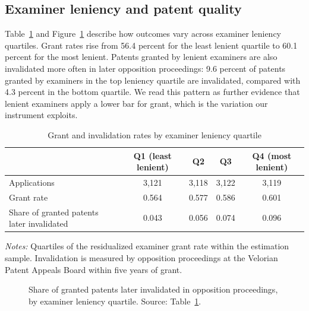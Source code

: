 \documentclass[11pt]{article}
\begin{document}
\subsection{Examiner leniency and patent quality}

Table~\ref{tab:quart} and Figure~\ref{fig:inval} describe how outcomes vary across examiner leniency quartiles. Grant rates rise from 56.4 percent for the least lenient quartile to 60.1 percent for the most lenient. Patents granted by lenient examiners are also invalidated more often in later opposition proceedings: 9.6 percent of patents granted by examiners in the top leniency quartile are invalidated, compared with 4.3 percent in the bottom quartile. We read this pattern as further evidence that lenient examiners apply a lower bar for grant, which is the variation our instrument exploits.

\begin{table}[htbp]
\centering
\begin{threeparttable}
\caption{Grant and invalidation rates by examiner leniency quartile}
\label{tab:quart}
\small
\begin{tabular}{lcccc}
\toprule
 & Q1 (least lenient) & Q2 & Q3 & Q4 (most lenient) \\
\midrule
Applications & 3,121 & 3,118 & 3,122 & 3,119 \\
Grant rate & 0.564 & 0.577 & 0.586 & 0.601 \\
Share of granted patents later invalidated & 0.043 & 0.056 & 0.074 & 0.096 \\
\bottomrule
\end{tabular}
\begin{tablenotes}\footnotesize
\item \textit{Notes:} Quartiles of the residualized examiner grant rate within the estimation sample. Invalidation is measured by opposition proceedings at the Velorian Patent Appeals Board within five years of grant.
\end{tablenotes}
\end{threeparttable}
\end{table}

\begin{figure}[htbp]
\centering
{}
\caption{Share of granted patents later invalidated in opposition proceedings, by examiner leniency quartile. Source: Table~\ref{tab:quart}.}
\label{fig:inval}
\end{figure}
\end{document}
